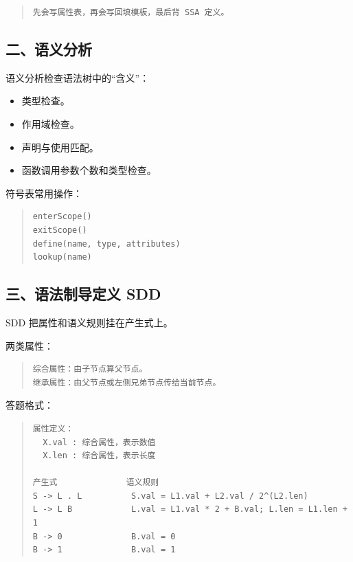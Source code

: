 \documentclass[UTF8,zihao=-4]{ctexart}
\begin{document}
\begin{quote}
\footnotesize
\begin{verbatim}
先会写属性表，再会写回填模板，最后背 SSA 定义。
\end{verbatim}
\end{quote}


\subsection{二、语义分析}


语义分析检查语法树中的“含义”：


\begin{itemize}
\item 类型检查。
\item 作用域检查。
\item 声明与使用匹配。
\item 函数调用参数个数和类型检查。
\end{itemize}


符号表常用操作：


\begin{quote}
\footnotesize
\begin{verbatim}
enterScope()
exitScope()
define(name, type, attributes)
lookup(name)
\end{verbatim}
\end{quote}


\subsection{三、语法制导定义 SDD}


SDD 把属性和语义规则挂在产生式上。


两类属性：


\begin{quote}
\footnotesize
\begin{verbatim}
综合属性：由子节点算父节点。
继承属性：由父节点或左侧兄弟节点传给当前节点。
\end{verbatim}
\end{quote}


答题格式：


\begin{quote}
\footnotesize
\begin{verbatim}
属性定义：
  X.val : 综合属性，表示数值
  X.len : 综合属性，表示长度

产生式              语义规则
S -> L . L          S.val = L1.val + L2.val / 2^(L2.len)
L -> L B            L.val = L1.val * 2 + B.val; L.len = L1.len + 1
B -> 0              B.val = 0
B -> 1              B.val = 1
\end{verbatim}
\end{quote}
\end{document}
